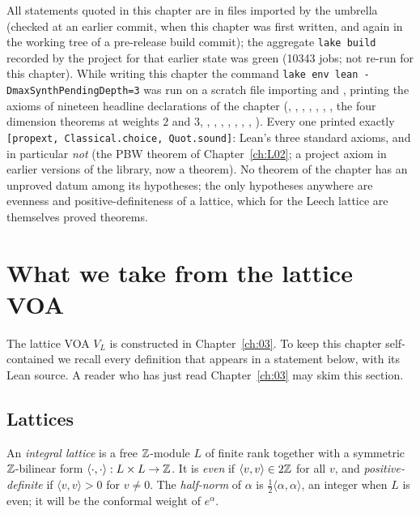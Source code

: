 \begin{status}
All statements quoted in this chapter are in files imported by the umbrella
 (checked at an earlier commit, when this chapter was first
written, and again in the working tree of a pre-release build commit); the
aggregate \texttt{lake build} recorded by the project for that earlier state was green
(10343 jobs; not re-run for this chapter). While writing this chapter the command
\texttt{lake env lean -DmaxSynthPendingDepth=3} was run on a scratch file importing
 and , printing the
axioms of nineteen headline declarations of the chapter (,
, , ,
, , ,
the four dimension theorems at weights $2$ and $3$, ,
, ,
, , ,
, ). Every one printed exactly
\texttt{[propext, Classical.choice, Quot.sound]}: Lean's three standard axioms, and in particular
\emph{not}  (the PBW theorem of Chapter~\ref{ch:L02}; a project axiom in earlier versions of the library, now a theorem). No theorem of the chapter has an unproved datum
among its hypotheses; the only hypotheses anywhere are evenness and positive-definiteness of a
lattice, which for the Leech lattice are themselves proved theorems.
\end{status}

\section{What we take from the lattice VOA}\label{ch04:sec:recall}

The lattice VOA $V_L$ is constructed in Chapter~\ref{ch:03}. To keep this chapter self-contained
we recall every definition that appears in a statement below, with its Lean source. A reader who
has just read Chapter~\ref{ch:03} may skim this section.

\subsection{Lattices}

\begin{definition}\label{ch04:def:lattice}
An \emph{integral lattice} is a free ${\mathbb{Z}}$-module $L$ of finite rank together with a symmetric
${\mathbb{Z}}$-bilinear form $\langle\cdot,\cdot\rangle:L\times L\to{\mathbb{Z}}$. It is \emph{even} if
$\langle v,v\rangle\in 2{\mathbb{Z}}$ for all $v$, and \emph{positive-definite} if $\langle v,v\rangle>0$ for
$v\neq0$. The \emph{half-norm} of $\alpha$ is $\tfrac12\langle\alpha,\alpha\rangle$, an integer
when $L$ is even; it will be the conformal weight of $e^\alpha$.
\end{definition}

